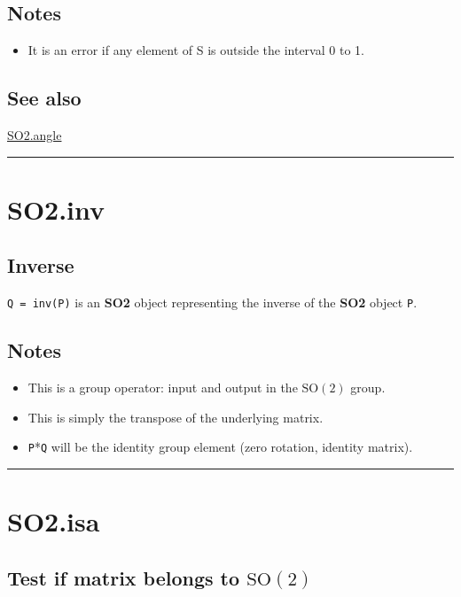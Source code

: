 \subsection*{Notes}
\begin{itemize}
  \item It is an error if any element of S is outside the interval 0 to 1.
\end{itemize}

\subsection*{See also}


\hyperlink{SO2.angle}{\color{blue} SO2.angle}

\vspace{1.5ex}\hrule

\hypertarget{SO2.inv}{\section*{SO2.inv}}
\subsection*{Inverse}


\texttt{Q = inv(P)} is an \textbf{\color{red} SO2} object representing the inverse of the \textbf{\color{red} SO2} object \texttt{P}.


\subsection*{Notes}
\begin{itemize}
  \item This is a group operator: input and output in the $\mbox{SO}(2)$ group.
  \item This is simply the transpose of the underlying matrix.
  \item \texttt{P}*\texttt{Q} will be the identity group element (zero rotation, identity matrix).
\end{itemize}
\vspace{1.5ex}\hrule

\hypertarget{SO2.isa}{\section*{SO2.isa}}
\subsection*{Test if matrix belongs to $\mbox{SO}(2)$}


